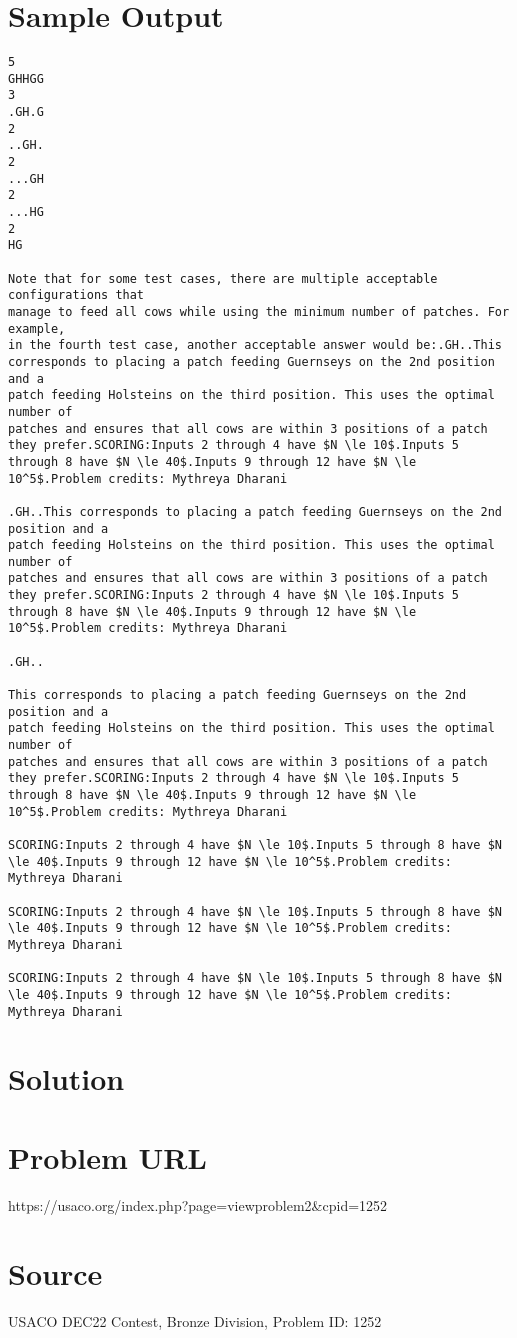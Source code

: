 \documentclass[12pt]{article}
\begin{document}
\section*{Sample Output}
\begin{verbatim}
5
GHHGG
3
.GH.G
2
..GH.
2
...GH
2
...HG
2
HG

Note that for some test cases, there are multiple acceptable configurations that
manage to feed all cows while using the minimum number of patches. For example,
in the fourth test case, another acceptable answer would be:.GH..This corresponds to placing a patch feeding Guernseys on the 2nd position and a
patch feeding Holsteins on the third position. This uses the optimal number of
patches and ensures that all cows are within 3 positions of a patch they prefer.SCORING:Inputs 2 through 4 have $N \le 10$.Inputs 5 through 8 have $N \le 40$.Inputs 9 through 12 have $N \le 10^5$.Problem credits: Mythreya Dharani

.GH..This corresponds to placing a patch feeding Guernseys on the 2nd position and a
patch feeding Holsteins on the third position. This uses the optimal number of
patches and ensures that all cows are within 3 positions of a patch they prefer.SCORING:Inputs 2 through 4 have $N \le 10$.Inputs 5 through 8 have $N \le 40$.Inputs 9 through 12 have $N \le 10^5$.Problem credits: Mythreya Dharani

.GH..

This corresponds to placing a patch feeding Guernseys on the 2nd position and a
patch feeding Holsteins on the third position. This uses the optimal number of
patches and ensures that all cows are within 3 positions of a patch they prefer.SCORING:Inputs 2 through 4 have $N \le 10$.Inputs 5 through 8 have $N \le 40$.Inputs 9 through 12 have $N \le 10^5$.Problem credits: Mythreya Dharani

SCORING:Inputs 2 through 4 have $N \le 10$.Inputs 5 through 8 have $N \le 40$.Inputs 9 through 12 have $N \le 10^5$.Problem credits: Mythreya Dharani

SCORING:Inputs 2 through 4 have $N \le 10$.Inputs 5 through 8 have $N \le 40$.Inputs 9 through 12 have $N \le 10^5$.Problem credits: Mythreya Dharani

SCORING:Inputs 2 through 4 have $N \le 10$.Inputs 5 through 8 have $N \le 40$.Inputs 9 through 12 have $N \le 10^5$.Problem credits: Mythreya Dharani
\end{verbatim}

\section*{Solution}


\section*{Problem URL}
https://usaco.org/index.php?page=viewproblem2&cpid=1252

\section*{Source}
USACO DEC22 Contest, Bronze Division, Problem ID: 1252
\end{document}
